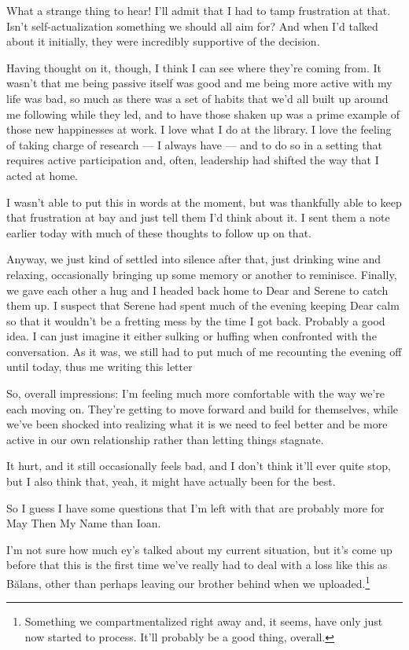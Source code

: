 What a strange thing to hear! I'll admit that I had to tamp frustration at that. Isn't self-actualization something we should all aim for? And when I'd talked about it initially, they were incredibly supportive of the decision.

Having thought on it, though, I think I can see where they're coming from. It wasn't that me being passive itself was good and me being more active with my life was bad, so much as there was a set of habits that we'd all built up around me following while they led, and to have those shaken up was a prime example of those new happinesses at work. I love what I do at the library. I love the feeling of taking charge of research — I always have — and to do so in a setting that requires active participation and, often, leadership had shifted the way that I acted at home.

I wasn't able to put this in words at the moment, but was thankfully able to keep that frustration at bay and just tell them I'd think about it. I sent them a note earlier today with much of these thoughts to follow up on that.

Anyway, we just kind of settled into silence after that, just drinking wine and relaxing, occasionally bringing up some memory or another to reminisce. Finally, we gave each other a hug and I headed back home to Dear and Serene to catch them up. I suspect that Serene had spent much of the evening keeping Dear calm so that it wouldn't be a fretting mess by the time I got back. Probably a good idea. I can just imagine it either sulking or huffing when confronted with the conversation. As it was, we still had to put much of me recounting the evening off until today, thus me writing this letter

So, overall impressions: I'm feeling much more comfortable with the way we're each moving on. They're getting to move forward and build for themselves, while we've been shocked into realizing what it is we need to feel better and be more active in our own relationship rather than letting things stagnate.

It hurt, and it still occasionally feels bad, and I don't think it'll ever quite stop, but I also think that, yeah, it might have actually been for the best.

So I guess I have some questions that I'm left with that are probably more for May Then My Name than Ioan.

I'm not sure how much ey's talked about my current situation, but it's come up before that this is the first time we've really had to deal with a loss like this as Bălans, other than perhaps leaving our brother behind when we uploaded.\footnote{Something we compartmentalized right away and, it seems, have only just now started to process. It'll probably be a good thing, overall.}

